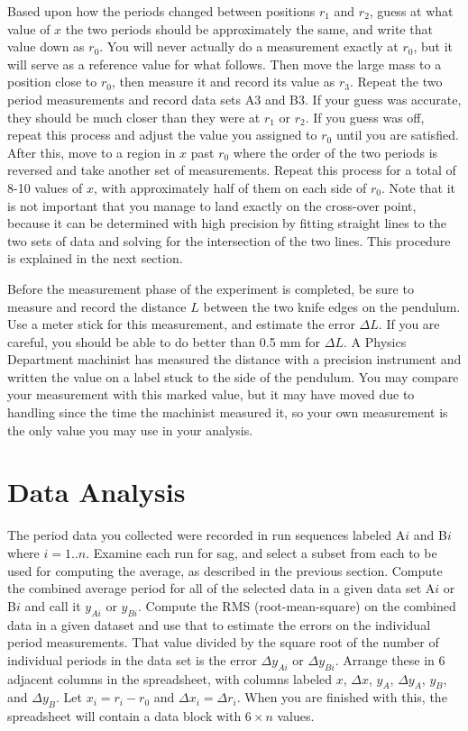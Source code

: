 \documentclass{revtex4}
\begin{document}
Based upon how the periods changed between positions $r_1$ and $r_2$,
guess at what value of $x$ the two periods should be approximately the
same, and write that value down as $r_0$.  You will never actually do
a measurement exactly at $r_0$, but it will serve as a reference value
for what follows.  Then move the large mass to a position close to $r_0$,
then measure it and record its value as $r_3$.
Repeat the two period measurements and record data sets A3 and B3.
If your guess was accurate, they should be much closer than they were
at $r_1$ or $r_2$.  If you guess was off, repeat this process and adjust
the value you assigned to $r_0$ until you are satisfied.  After this,
move to a region in $x$ past $r_0$ where the order of the two periods
is reversed and take another set of measurements.  Repeat this process
for a total of 8-10 values of $x$, with approximately half of them
on each side of $r_0$.  Note that it is not important that you manage
to land exactly on the cross-over point, because it can be determined
with high precision by fitting straight lines to the two sets of data
and solving for the intersection of the two lines.  This procedure is
explained in the next section.

Before the measurement phase of the experiment is completed, be sure to
measure and record the distance $L$ between the two knife edges on the
pendulum.  Use a meter stick for this measurement, and estimate the
error $\Delta L$.  If you are careful, you should be able to do better
than 0.5 mm for $\Delta L$.  A Physics Department machinist has measured
the distance with a precision instrument and written the value on a label
stuck to the side of the pendulum.  You may compare your measurement 
with this marked value, but it may have moved due to handling since the
time the machinist measured it, so your own measurement is the only value
you may use in your analysis.

\section{Data Analysis}

The period data you collected were recorded in run sequences labeled A$i$ and
B$i$ where $i=1..n$.  Examine each run for sag, and select a subset from each
to be used for computing the average, as described in the previous section.
Compute the combined average period for all of the selected data in a given 
data set A$i$ or B$i$ and call it $y_{Ai}$ or $y_{Bi}$.  Compute the RMS
(root-mean-square) on the combined data in a given dataset and use that to
estimate the errors on the individual period measurements.  That value
divided by the square root of the number of individual periods in the data
set is the error $\Delta y_{Ai}$ or $\Delta y_{Bi}$.  Arrange these in
6 adjacent columns in the spreadsheet, with columns labeled $x$, $\Delta x$,
$y_A$, $\Delta y_A$, $y_B$, and $\Delta y_B$.  Let $x_i=r_i-r_0$ and
$\Delta x_i=\Delta r_i$.  When you are finished with this, the spreadsheet
will contain a data block with $6\times n$ values.
\end{document}
